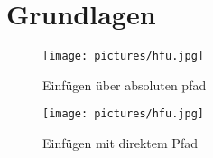 \chapter{Grundlagen}
\begin{figure}

    \caption{Einfügen über absoluten pfad}
    \texttt{[image: pictures/hfu.jpg]}
    \label{pic:bild3}
\end{figure}

\begin{figure}
    \centering
    \texttt{[image: pictures/hfu.jpg]}
    \caption{Einfügen mit direktem Pfad}
    \label{La12bel}
\end{figure}
